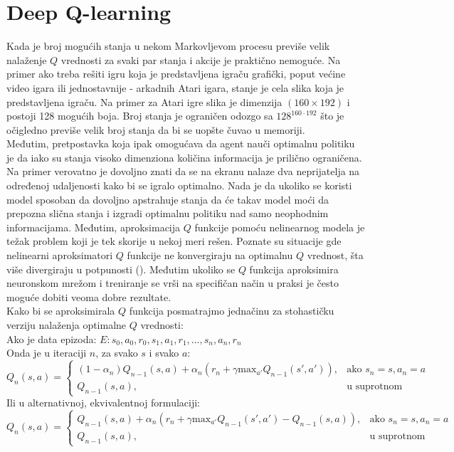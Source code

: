 \documentclass[a4paper,fleqn,12pt]{JMThesis}
\newcommand{\latin}{\fontencoding{T1}\selectfont\selectlanguage{english}}
\theoremstyle{plain}
\theoremstyle{definition}
\theoremstyle{definition}
\begin{document}
\section{Deep Q-learning}
Kada je broj mogućih stanja u nekom Markovljevom procesu previše velik nalaženje $Q$ vrednosti za svaki par stanja i akcije je praktično
nemoguće. Na primer ako treba rešiti igru koja je predstavljena igraču grafički, poput većine video igara ili jednostavnije -
arkadnih Atari igara, stanje je cela slika koja je predstavljena igraču. Na primer za Atari igre slika je dimenzija $(160 \times 192)$
i postoji 128 mogućih boja. Broj stanja je ograničen odozgo sa $128^{160\cdot 192}$ što je očigledno previše velik broj stanja da bi
se uopšte čuvao u memoriji.\\
Međutim, pretpostavka koja ipak omogućava da agent nauči optimalnu politiku je da iako su stanja visoko dimenziona količina informacija je
prilično ograničena. Na primer verovatno je dovoljno znati da se na ekranu nalaze dva neprijatelja na određenoj udaljenosti kako bi
se igralo optimalno. Nada je da ukoliko se koristi model sposoban da dovoljno apstrahuje stanja da će takav model moći da
prepozna slična stanja i izgradi optimalnu politiku nad samo neophodnim informacijama. Međutim, aproksimacija $Q$ funkcije pomoću
nelinearnog modela je težak problem koji je tek skorije u nekoj meri rešen. Poznate su situacije gde nelinearni aproksimatori
$Q$ funkcije ne konvergiraju na optimalnu $Q$ vrednost, šta više divergiraju u potpunosti (\latin \cite{NEURIPS2018_5fd0245f}). 
Međutim ukoliko se $Q$ funkcija aproksimira neuronskom mrežom i treniranje se vrši na specifičan način u praksi je često moguće dobiti
veoma dobre rezultate.\\
Kako bi se aproksimirala $Q$ funkcija posmatrajmo jednačinu za stohastičku verziju nalaženja optimalne $Q$ vrednosti:\\
Ako je data epizoda: $E: s_0,a_0,r_0,s_1,a_1,r_1,...,s_n,a_n,r_n$\\
Onda je u iteraciji $n$, za svako $s$ i svako $a$:\\
\[ 
	Q_n(s,a) =
	\begin{cases}
		(1-\alpha_n)Q_{n-1}(s,a) + \alpha_n (r_n + \gamma \text{max}_{a'}Q_{n-1}(s',a')), & \text{ako } s_n = s, a_n = a\\
		Q_{n-1}(s,a), & \text{u suprotnom}
	\end{cases}
\]
Ili u alternativnoj, ekvivalentnoj formulaciji:
\[ 
	Q_n(s,a) =
	\begin{cases}
		Q_{n-1}(s,a) + \alpha_n (r_n + \gamma \text{max}_{a'}Q_{n-1}(s',a') - Q_{n-1}(s,a)), & \text{ako } s_n = s, a_n = a\\
		Q_{n-1}(s,a), & \text{u suprotnom}
	\end{cases}
\]
\end{document}
